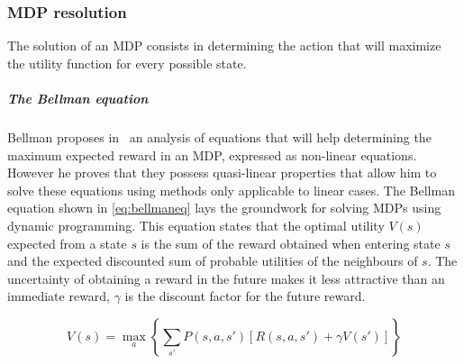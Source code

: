 \subsubsection{MDP resolution}
The solution of an MDP consists in determining the action that will maximize the utility function for every possible state.

\subparagraph{The Bellman equation}
Bellman proposes in~\cite{bellman1957} an analysis of equations that will help determining the maximum expected reward in an MDP, expressed as non-linear equations. However he proves that they possess quasi-linear properties that allow him to solve these equations using methods only applicable to linear cases. 
The Bellman equation shown in \eqref{eq:bellmaneq} lays the groundwork for solving MDPs using dynamic programming.
This equation states that the optimal utility $V(s)$ expected from a state $s$ is the sum of the reward obtained when entering state $s$ and the expected discounted sum of probable utilities of the neighbours of $s$. The uncertainty of obtaining a reward in the future makes it less attractive than an immediate reward, $\gamma$ is the discount factor for the future reward.

\begin{equation}
V(s) = \max\limits_a \left \{\sum\limits_{s'}P(s,a,s')[R(s,a,s') + \gamma    V(s')  ] \right \}
\label{eq:bellmaneq}
\end{equation}






